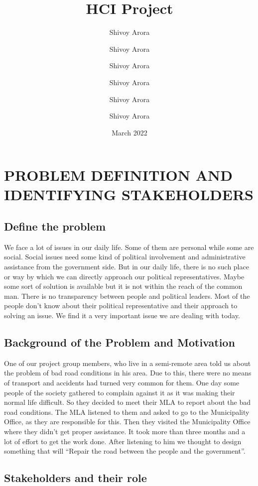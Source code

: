 \documentclass[manuscript,screen,review]{acmart}
\title{HCI Project}
\author{Shivoy Arora}
\author{Shivoy Arora}
\author{Shivoy Arora}
\author{Shivoy Arora}
\author{Shivoy Arora}
\author{Shivoy Arora}
\date{March 2022}
\begin{document}
\maketitle

\section{PROBLEM DEFINITION AND IDENTIFYING STAKEHOLDERS}

\subsection{Define the problem}
We face a lot of issues in our daily life. Some of them are personal while some are social. Social issues need some kind of political involvement and administrative assistance from the government side. But in our daily life, there is no such place or way by which we can directly approach our political representatives. Maybe some sort of solution is available but it is not within the reach of the common man. There is no transparency between people and political leaders. Most of the people don’t know about their political representative and their approach to solving an issue. We find it a very important issue we are dealing with today.

\subsection{Background of the Problem and Motivation}
One of our project group members, who live in a semi-remote area told us about the problem of bad road conditions in his area. Due to this, there were no means of transport and accidents had turned very common for them. One day some people of the society gathered to complain against it as it was making their normal life difficult. So they decided to meet their MLA to report about the bad road conditions. The MLA listened to them and asked to go to the Municipality Office, as they are responsible for this. Then they visited the Municipality Office where they didn’t get proper assistance. It took more than three months and a lot of effort to get the work done. After listening to him we thought to design something that will “Repair the road between the people and the government”.

\subsection{Stakeholders and their role}
\end{document}

